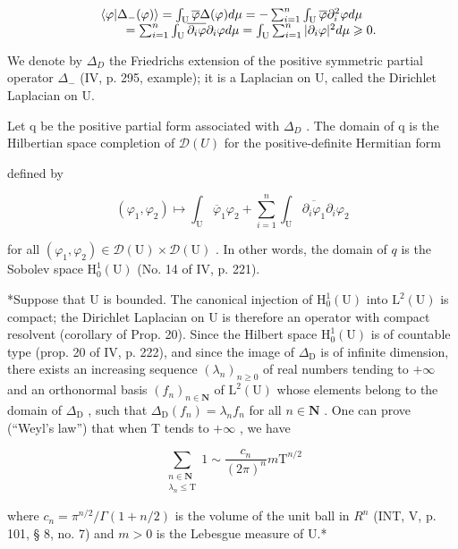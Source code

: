 \[
\begin{array}{r l} & {\langle \varphi | \Delta_ {-} (\varphi) \rangle = \int_ {\mathrm{U}} \overline {{\varphi}} \Delta (\varphi) d \mu = - \sum_ {i = 1} ^ {n} \int_ {\mathrm{U}} \overline {{\varphi}} \partial_ {i} ^ {2} \varphi d \mu} \\ & {\qquad = \sum_ {i = 1} ^ {n} \int_ {\mathrm{U}} \overline {{\partial_ {i} \varphi}} \partial_ {i} \varphi d \mu = \int_ {\mathrm{U}} \sum_ {i = 1} ^ {n} | \partial_ {i} \varphi | ^ {2} d \mu \geqslant 0.} \end{array}
\]

We denote by \(\Delta_{D}\) the Friedrichs extension of the positive symmetric partial operator \(\Delta_{-}\) (IV, p. 295, example); it is a Laplacian on U, called the Dirichlet Laplacian on U.

Let q be the positive partial form associated with \(\Delta_{D}\) . The domain of q is the Hilbertian space completion of \(\mathcal{D}(U)\) for the positive-definite Hermitian form

defined by

\[
(\varphi_ {1}, \varphi_ {2}) \mapsto \int_ {\mathrm{U}} \overline {{\varphi}} _ {1} \varphi_ {2} + \sum_ {i = 1} ^ {n} \int_ {\mathrm{U}} \overline {{\partial_ {i} \varphi_ {1}}} \partial_ {i} \varphi_ {2}
\]

for all \((\varphi_{1},\varphi_{2})\in\mathcal{D}(\mathrm{U})\times\mathcal{D}(\mathrm{U})\) . In other words, the domain of \(q\) is the Sobolev space \(\mathrm{H}_{0}^{1}(\mathrm{U})\) (No. 14 of IV, p. 221).

*Suppose that U is bounded. The canonical injection of \(\mathrm{H}_0^1 (\mathrm{U})\) into \(\mathrm{L}^2 (\mathrm{U})\) is compact; the Dirichlet Laplacian on U is therefore an operator with compact resolvent (corollary of Prop. 20). Since the Hilbert space \(\mathrm{H}_0^1 (\mathrm{U})\) is of countable type (prop. 20 of IV, p. 222), and since the image of \(\Delta_{\mathrm{D}}\) is of infinite dimension, there exists an increasing sequence \((\lambda_n)_{n\geqslant 0}\) of real numbers tending to \(+\infty\) and an orthonormal basis \((f_n)_{n\in \mathbf{N}}\) of \(\mathrm{L}^2 (\mathrm{U})\) whose elements belong to the domain of \(\Delta_{\mathrm{D}}\) , such that \(\Delta_{\mathrm{D}}(f_n) = \lambda_n f_n\) for all \(n\in \mathbf{N}\) . One can prove (“Weyl’s law”) that when T tends to \(+\infty\) , we have

\[
\sum_{\substack{n\in \mathbf{N}\\ \lambda_{n}\leqslant \mathrm{T}}}1\sim \frac{c_{n}}{(2\pi)^{n}} m\mathrm{T}^{n / 2}
\]

where \(c_{n} = \pi^{n/2}/\Gamma(1 + n/2)\) is the volume of the unit ball in \(R^{n}\) (INT, V, p. 101, § 8, no. 7) and \(m > 0\) is the Lebesgue measure of U.*

